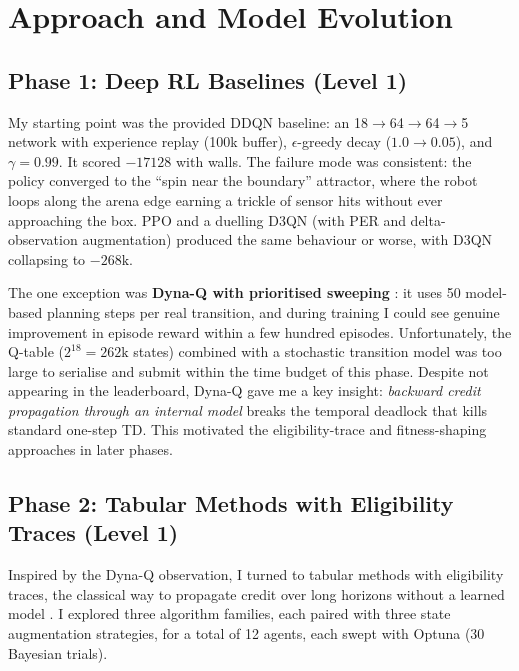 \documentclass[11pt, oneside]{article}
\begin{document}
\section{Approach and Model Evolution}

\subsection{Phase 1: Deep RL Baselines (Level 1)}

My starting point was the provided DDQN baseline: an 18$\to$64$\to$64$\to$5 network with experience replay (100k buffer), $\epsilon$-greedy decay ($1.0 \to 0.05$), and $\gamma = 0.99$. It scored $-17128$ with walls. The failure mode was consistent: the policy converged to the ``spin near the boundary'' attractor, where the robot loops along the arena edge earning a trickle of sensor hits without ever approaching the box. PPO and a duelling D3QN (with PER and delta-observation augmentation) produced the same behaviour or worse, with D3QN collapsing to $-268\text{k}$.

The one exception was \textbf{Dyna-Q with prioritised sweeping} \cite{sutton2018}: it uses 50 model-based planning steps per real transition, and during training I could see genuine improvement in episode reward within a few hundred episodes. Unfortunately, the Q-table ($2^{18} = 262\text{k}$ states) combined with a stochastic transition model was too large to serialise and submit within the time budget of this phase. Despite not appearing in the leaderboard, Dyna-Q gave me a key insight: \emph{backward credit propagation through an internal model} breaks the temporal deadlock that kills standard one-step TD. This motivated the eligibility-trace and fitness-shaping approaches in later phases.

\subsection{Phase 2: Tabular Methods with Eligibility Traces (Level 1)}

Inspired by the Dyna-Q observation, I turned to tabular methods with eligibility traces, the classical way to propagate credit over long horizons without a learned model \cite{sutton2018}. I explored three algorithm families, each paired with three state augmentation strategies, for a total of 12 agents, each swept with Optuna (30 Bayesian trials).
\end{document}
